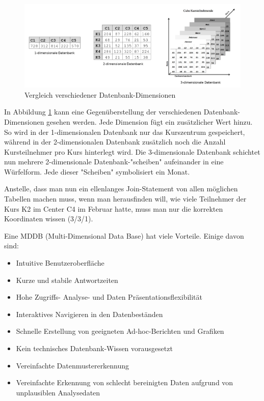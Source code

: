 \documentclass[a4paper, 11pt, nofootinbib]{article}
\begin{document}
\vspace{40px}

\begin{figure}[htb]
	\centering
	\includegraphics[keepaspectratio=true,height=12.5\baselineskip]{mddbs.png}
	\caption{Vergleich verschiedener Datenbank-Dimensionen}
	\label{fig:mddbs}
\end{figure}

In Abbildung \ref{fig:mddbs} kann eine Gegenüberstellung der verschiedenen Datenbank-Dimensionen gesehen werden. Jede Dimension fügt ein zusätzlicher Wert hinzu. So wird in der 1-dimensionalen Datenbank nur das Kurszentrum gespeichert, während in der 2-dimensionalen Datenbank zusätzlich noch die Anzahl Kursteilnehmer pro Kurs hinterlegt wird. Die 3-dimensionale Datenbank schichtet nun mehrere 2-dimensionale Datenbank-"scheiben" aufeinander in eine Würfelform. Jede dieser "Scheiben" symbolisiert ein Monat.

Anstelle, dass man nun ein ellenlanges Join-Statement von allen möglichen Tabellen machen muss, wenn man herausfinden will, wie viele Teilnehmer der Kurs K2 im Center C4 im Februar hatte, muss man nur die korrekten Koordinaten wissen (3/3/1).

\newpage

\noindent Eine MDDB (Multi-Dimensional Data Base) hat viele Vorteile. Einige davon sind:

\begin{itemize}
	\item Intuitive Benutzeroberfläche
	\item Kurze und stabile Antwortzeiten
	\item Hohe Zugriffs- Analyse- und Daten Präsentationsflexibilität
	\item Interaktives Navigieren in den Datenbeständen
	\item Schnelle Erstellung von geeigneten Ad-hoc-Berichten und Grafiken
	\item Kein technisches Datenbank-Wissen vorausgesetzt
	\item Vereinfachte Datenmustererkennung
	\item Vereinfachte Erkennung von schlecht bereinigten Daten aufgrund von unplausiblen Analysedaten
\end{itemize}
\end{document}
